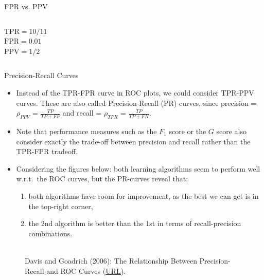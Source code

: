 \documentclass[11pt,compress,t,notes=noshow, xcolor=table]{beamer}
\begin{document}
\begin{frame}{FPR vs. PPV}
\begin{columns}
\begin{column}{0.45\textwidth}
				\medskip
				$\text{TPR} = 10/11$\\
				$\text{FPR} = 0.01$\\
				$\text{PPV} = 1/2$
			\end{column}
		\end{columns}
		
		
		
		
		
	\end{frame}
	
	\begin{frame}{Precision-Recall Curves}
		
		\footnotesize{
			\begin{itemize}
%				
				\item Instead of the TPR-FPR curve in ROC plots, we could consider TPR-PPV curves. These are also called Precision-Recall (PR) curves, since precision = $\rho_{PPV}$ = $\frac{TP}{TP + FP}$ and recall = $\rho_{TPR}$ = $\frac{TP}{TP + FN}.$
%
				\item Note that performance measures such as the $F_1$ score or the $G$ score also consider exactly the trade-off between precision and recall rather than the TPR-FPR tradeoff. 
%				
				\item Considering the figures below: both learning algorithms seem to perform well w.r.t.\ the ROC curves, but the PR-curves reveal that: 
%				
				\begin{enumerate}
%					
					\footnotesize
					\item both algorithms have room for improvement, as the best we can get is in the top-right corner,
%					
					\item the 2nd algorithm is better than the 1st in terms of recall-precision combinations.
%					
				\end{enumerate}
%				
%				
			\end{itemize}
		\vfill
		
		\begin{figure}
			\centering
			\tiny
			\\Davis and Goadrich (2006): The Relationship Between Precision-Recall and
			ROC Curves (\href{https://www.biostat.wisc.edu/~page/rocpr.pdf}
			{\underline{URL}}).
		\end{figure}
		
}
\end{frame}
\end{document}
